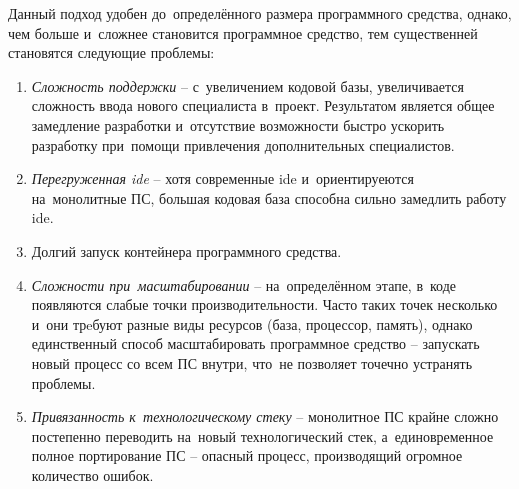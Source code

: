 Данный подход удобен до~определённого размера программного средства, однако, чем больше и~сложнее становится программное средство, тем существенней становятся следующие проблемы:

\begin{enumerate}
	\item \emph{Сложность поддержки} -- с~увеличением кодовой базы, увеличивается сложность ввода нового специалиста в~проект. Результатом является общее замедление разработки и~отсутствие возможности быстро ускорить разработку при~помощи привлечения дополнительных специалистов.
	\item \emph{Перегруженная \gls{ide}} -- хотя современные \gls{ide} и~ориентируеются на~монолитные ПС, большая кодовая база способна сильно замедлить работу \gls{ide}.
	\item Долгий запуск контейнера программного средства.
	\item \emph{Сложности при~масштабировании} -- на~определённом этапе, в~коде появляются слабые точки производительности. Часто таких точек несколько и~они трeбуют разные виды ресурсов (база, процессор, память), однако единственный способ масштабировать программное средство -- запускать новый процесс со всем ПС внутри, что~не позволяет точечно устранять проблемы.
	\item \emph{Привязанность к~технологическому стеку} -- монолитное ПС крайне сложно постепенно переводить на~новый технологический стек, а~единовременное полное портирование ПС -- опасный процесс, производящий огромное количество ошибок.
\end{enumerate}